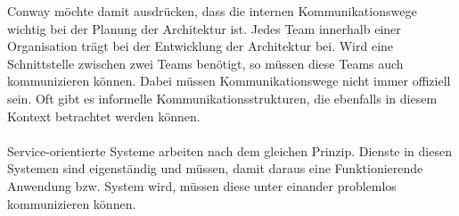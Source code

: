 Conway möchte damit ausdrücken, dass die internen Kommunikationswege wichtig bei der Planung der Architektur ist. Jedes Team innerhalb einer Organisation trägt bei der Entwicklung der Architektur bei. Wird eine Schnittstelle zwischen zwei Teams benötigt, so müssen diese Teams auch kommunizieren können. Dabei müssen Kommunikationswege nicht immer offiziell sein. Oft gibt es informelle Kommunikationsstrukturen, die ebenfalls in diesem Kontext betrachtet werden können.
\\\\
Service-orientierte Systeme arbeiten nach dem gleichen Prinzip. Dienste in diesen Systemen sind eigenständig und müssen, damit daraus eine Funktionierende Anwendung bzw. System wird, müssen diese unter einander problemlos kommunizieren können.